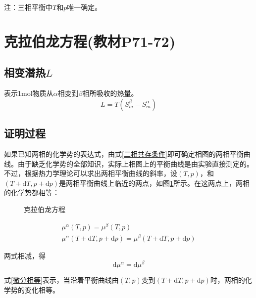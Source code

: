 \documentclass[oneside]{ctexbook}
\begin{document}
注：三相平衡中\(T\)和\(p\)唯一确定。

\section{克拉伯龙方程(教材P71-72)}

\subsection{相变潜热\(L\)}

表示1mol物质从\(\alpha\)相变到\(\beta\)相所吸收的热量。
\begin{equation}
L=T(S_m^\beta-S_m^\alpha)
\end{equation}

\subsection{证明过程}

如果已知两相的化学势的表达式，由式\ref{二相共存条件}即可确定相图的两相平衡曲线。由于缺乏化学势的全部知识，实际上相图上的平衡曲线是由实验直接测定的。不过，根据热力学理论可以求出两相平衡曲线的斜率，设\((T,p)\)，和\((T+\mathrm{d}T,p+\mathrm{d}p)\)是两相平衡曲线上临近的两点，如图\ref{pic:a}所示。在这两点上，两相的化学势都相等：

\begin{figure}[htbp]
    \centering
    \caption{克拉伯龙方程}\label{pic:a}
\end{figure}
\begin{gather*}
    \mu^\alpha(T,p)=\mu^\beta(T,p)\\
    \mu^\alpha(T+\mathrm{d}T,p+\mathrm{d}p)=\mu^\beta(T+\mathrm{d}T,p+\mathrm{d}p)
\end{gather*}

两式相减，得
\begin{equation}
    \mathrm{d}\mu^\alpha=\mathrm{d}\mu^\beta\label{微分相等}
\end{equation}

式\ref{微分相等}表示，当沿着平衡曲线由\((T,p)\)变到\((T+\mathrm{d}T,p+\mathrm{d}p)\)时，两相的化学势的变化相等。
\end{document}
